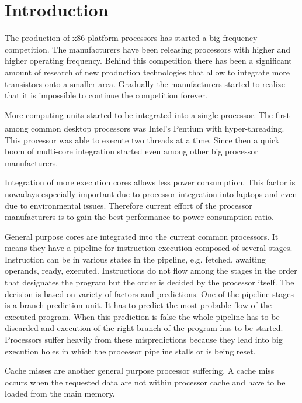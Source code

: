 \chapter{Introduction}

\par
The production of x86 platform processors has started a big frequency competition.
The manufacturers have been releasing processors with higher and higher operating frequency.
Behind this competition there has been a significant amount of research of new production technologies that allow to integrate more transistors onto a smaller area.
Gradually the manufacturers started to realize that it is impossible to continue the competition forever.

\par
More computing units started to be integrated into a single processor.
The first among common desktop processors was Intel's Pentium\textsuperscript{\textregistered} with hyper-threading.
This processor was able to execute two threads at a time.
Since then a quick boom of multi-core integration started even among other big processor manufacturers.

\par
Integration of more execution cores allows less power consumption.
This factor is nowadays especially important due to processor integration into laptops and even due to environmental issues.
Therefore current effort of the processor manufacturers is to gain the best performance to power consumption ratio.

\par
General purpose cores are integrated into the current common processors.
It means they have a pipeline for instruction execution composed of several stages.
Instruction can be in various states in the pipeline, e.g. fetched, awaiting operands, ready, executed.
Instructions do not flow among the stages in the order that designates the program but the order is decided by the processor itself.
The decision is based on variety of factors and predictions.
One of the pipeline stages is a branch-prediction unit.
It has to predict the most probable flow of the executed program.
When this prediction is false the whole pipeline has to be discarded and execution of the right branch of the program has to be started.
Processors suffer heavily from these mispredictions because they lead into big execution holes in which the processor pipeline stalls or is being reset.\\

\par
Cache misses are another general purpose processor suffering.
A cache miss occurs when the requested data are not within processor cache and have to be loaded from the main memory.

